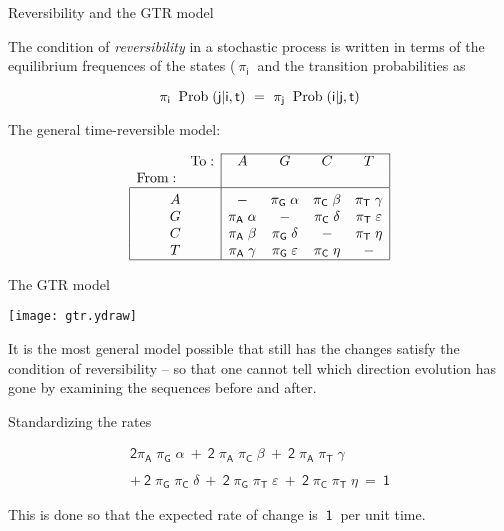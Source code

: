 \documentclass[bluish,slideColor,colorBG,pdf]{prosper}
\def\prob{{\rm \;Prob\;}}
\begin{document}
\begin{slide}[Replace]{Reversibility and the GTR model}
\bigskip

The condition of {\it reversibility} in a stochastic process is written in
terms of the equilibrium frequences of the states ($\ \mathsf{\pi_i}\ $ and
the transition probabilities as

\[
\mathsf{\pi_i\;\prob(j | i, t)\ =\ \pi_j\;\prob(i | j, t)}
\]
\bigskip

The general time-reversible model:

\[\begin{array}{c c | c c c c |}
\cline{3-6}
 & {\rm To:} & A & G & C & T \\ 
{\rm From:} & & & & & \\
\hline
\multicolumn{2}{|c|}{A} & {\rm\raisebox{3pt}{\strut} -} & \mathsf{\pi_G\;\alpha} & \mathsf{\pi_C\;\beta} & \mathsf{\pi_T\;\gamma} \\
\multicolumn{2}{|c|}{G} & \mathsf{\pi_A\;\alpha} & {\rm -} & \mathsf{\pi_C\;\delta} & \mathsf{\pi_T\;\varepsilon} \\
\multicolumn{2}{|c|}{C} & \mathsf{\pi_A\;\beta} & \mathsf{\pi_G\;\delta} & {\rm -} & \mathsf{\pi_T\;\eta} \\
\multicolumn{2}{|c|}{T} & \mathsf{\pi_A\;\gamma} & \mathsf{\pi_G\;\varepsilon} & \mathsf{\pi_C\;\eta} & {\rm -}\\
\hline
\end{array}
\]

\end{slide}

\begin{slide}[Replace]{The GTR model}

\centerline{\texttt{[image: gtr.ydraw]}}
\bigskip

It is the most general model possible that still has the changes satisfy the
condition of reversibility -- so that one cannot tell which direction evolution
has gone by examining the sequences before and after.

\end{slide}

\begin{slide}[Replace]{Standardizing the rates}
\bigskip

{
\[
\begin{array}{l}
\mathsf{2\pi_A\;\pi_G\;\alpha\ +\ 2\;\pi_A\;\pi_C\;\beta\ +\ 2\;\pi_A\;\pi_T\;\gamma}\\
\\
 \mathsf{+\ 2\;\pi_G\;\pi_C\;\delta\ +\ 2\;\pi_G\;\pi_T\;\varepsilon\ +\ 2\;\pi_C\;\pi_T\;\eta\ =\ 1}
\end{array}
\]
}
\bigskip

This is done so that the expected rate of change is $\ \mathsf{1}\ $ per unit
time.

\end{slide}
\end{document}

